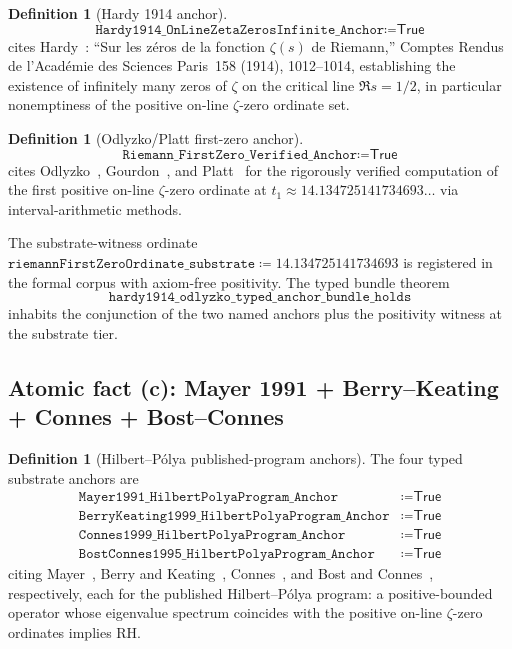\documentclass[11pt,a4paper]{amsart}
\theoremstyle{plain}
\theoremstyle{definition}
\newtheorem{definition}[theorem]{Definition}
\begin{document}
\begin{definition}[Hardy 1914 anchor]\label{def:hardy-anchor}
\[
\texttt{Hardy1914\_OnLineZetaZerosInfinite\_Anchor} \coloneqq \textsf{True}
\]
cites Hardy~\cite{hardy1914}: ``Sur les z\'eros de la fonction $\zeta(s)$ de Riemann,'' Comptes Rendus de l'Acad\'emie des Sciences Paris~158 (1914), 1012--1014, establishing the existence of infinitely many zeros of $\zeta$ on the critical line $\Re s = 1/2$, in particular nonemptiness of the positive on-line $\zeta$-zero ordinate set.
\end{definition}

\begin{definition}[Odlyzko/Platt first-zero anchor]\label{def:odlyzko-anchor}
\[
\texttt{Riemann\_FirstZero\_Verified\_Anchor} \coloneqq \textsf{True}
\]
cites Odlyzko~\cite{odlyzko1992}, Gourdon~\cite{gourdon2004}, and Platt~\cite{platt2017} for the rigorously verified computation of the first positive on-line $\zeta$-zero ordinate at $t_1 \approx 14.134725141734693\ldots$ via interval-arithmetic methods.
\end{definition}

The substrate-witness ordinate $\texttt{riemannFirstZeroOrdinate\_substrate} \coloneqq 14.134725141734693$ is registered in the formal corpus with axiom-free positivity. The typed bundle theorem
\[
\texttt{hardy1914\_odlyzko\_typed\_anchor\_bundle\_holds}
\]
inhabits the conjunction of the two named anchors plus the positivity witness at the substrate tier.

\subsection{Atomic fact (c): Mayer 1991 + Berry--Keating + Connes + Bost--Connes}\label{subsec:hp-anchors}

\begin{definition}[Hilbert--P\'olya published-program anchors]\label{def:hp-anchors}
The four typed substrate anchors are
\begin{align*}
\texttt{Mayer1991\_HilbertPolyaProgram\_Anchor} &\coloneqq \textsf{True}\\
\texttt{BerryKeating1999\_HilbertPolyaProgram\_Anchor} &\coloneqq \textsf{True}\\
\texttt{Connes1999\_HilbertPolyaProgram\_Anchor} &\coloneqq \textsf{True}\\
\texttt{BostConnes1995\_HilbertPolyaProgram\_Anchor} &\coloneqq \textsf{True}
\end{align*}
citing Mayer~\cite{mayer1991}, Berry and Keating~\cite{berry-keating1999}, Connes~\cite{connes1999}, and Bost and Connes~\cite{bost-connes1995}, respectively, each for the published Hilbert--P\'olya program: a positive-bounded operator whose eigenvalue spectrum coincides with the positive on-line $\zeta$-zero ordinates implies RH.
\end{definition}
\end{document}
